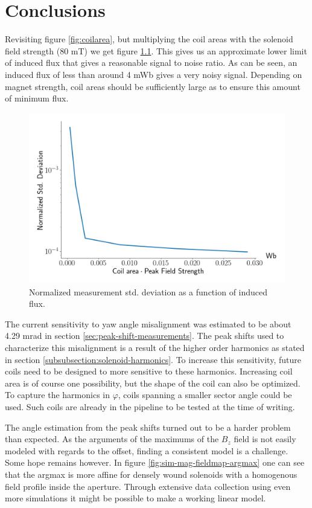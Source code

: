 \chapter{Conclusions}
Revisiting figure \ref{fig:coilarea}, but multiplying
the coil areas with the solenoid field strength ($80$ mT)
we get figure \ref{fig:coilarea-weber}. This gives us an approximate
lower limit of induced flux that gives a reasonable signal 
to noise ratio. As can be seen, an induced flux of less than around
4 mWb gives a very noisy signal. Depending on magnet strength,
coil areas should be sufficiently large as to 
ensure this amount of minimum flux.

\begin{figure}[!h]
    \centering
    \includegraphics[width=0.8\linewidth]{figs/areatofield}
    \caption{Normalized measurement std. deviation as a function of
        induced flux.}
    \label{fig:coilarea-weber}
\end{figure}

The current sensitivity to yaw angle misalignment was estimated
to be about 4.29 mrad in section \ref{sec:peak-shift-measurements}.
The peak shifts used to characterize this misalignment is a
result of the higher order harmonics as stated in section
\ref{subsubsection:solenoid-harmonics}. To increase this
sensitivity, future coils need to be designed to more
sensitive to these harmonics. Increasing coil area is
of course one possibility, but the shape of the coil can
also be optimized. To capture the harmonics in $\varphi$,
coils spanning a smaller sector angle could be used. Such
coils are already in the pipeline to be tested at the time
of writing.

The angle estimation from the peak shifts turned out to be 
a harder problem than expected. As the arguments of the maximums of the
$B_z$ field is not easily modeled with regards to the offset, finding
a consistent model is a challenge. Some hope remains however. In figure
\ref{fig:sim-mag-fieldmap-argmax} one can see that the argmax is more affine
for densely wound solenoids with a homogenous field profile inside the aperture.
Through extensive data collection using even more simulations it might be
possible to make a working linear model.

